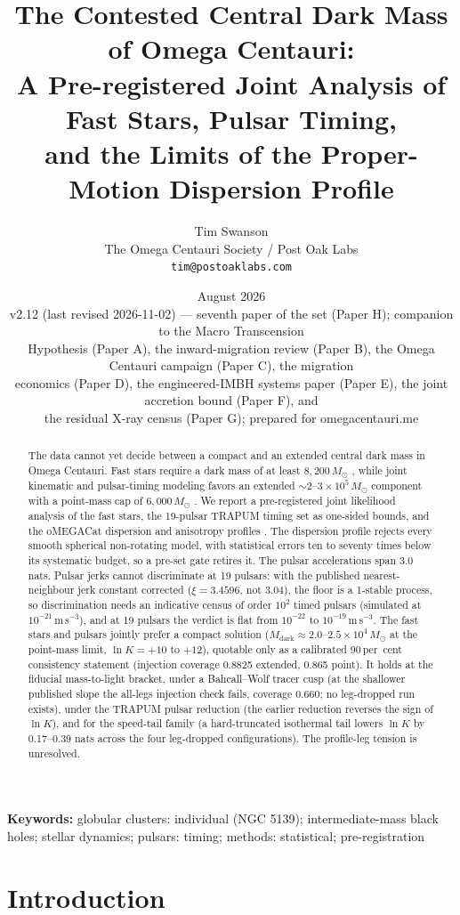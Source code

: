 \documentclass[11pt]{article}
\title{\textbf{The Contested Central Dark Mass of Omega Centauri:\\ A Pre-registered Joint Analysis of Fast Stars, Pulsar Timing,\\ and the Limits of the Proper-Motion Dispersion Profile}}
\author{Tim Swanson\\[2pt]
\small The Omega Centauri Society / Post Oak Labs\\
\small \texttt{tim@postoaklabs.com}}
\date{August 2026 \\[4pt] \small v2.12 (last revised 2026-11-02) --- seventh paper of the set (Paper H); companion to the Macro Transcension\\ \small Hypothesis (Paper A), the inward-migration review (Paper B), the Omega Centauri campaign (Paper C), the migration\\ \small economics (Paper D), the engineered-IMBH systems paper (Paper E), the joint accretion bound (Paper F), and\\ \small the residual X-ray census (Paper G); prepared for omegacentauri.me}
\newcommand{\msun}{\ensuremath{M_\odot}}
\newcommand{\mdark}{\ensuremath{M_{\mathrm{dark}}}}
\newcommand{\lnK}{\ensuremath{\ln K}}
\begin{document}
\maketitle

\begin{abstract}
\noindent
The data cannot yet decide between a compact and an extended central dark mass in Omega Centauri. Fast stars require a dark mass of at least $8{,}200\,\msun$ \citep{Haberle2024Nature}, while joint kinematic and pulsar-timing modeling favors an extended $\sim 2$--$3\times10^{5}\,\msun$ component with a point-mass cap of $6{,}000\,\msun$ \citep{BanaresHernandez2025}. We report a pre-registered joint likelihood analysis of the fast stars, the 19-pulsar TRAPUM timing set \citep{ColomiBernadich2026} as one-sided bounds, and the oMEGACat dispersion and anisotropy profiles \citep{oMEGACatVI2025}. The dispersion profile rejects every smooth spherical non-rotating model, with statistical errors ten to seventy times below its systematic budget, so a pre-set gate retires it. The pulsar accelerations span 3.0 nats. Pulsar jerks cannot discriminate at 19 pulsars: with the published nearest-neighbour jerk constant corrected ($\xi = 3.4596$, not 3.04), the floor is a 1-stable process, so discrimination needs an indicative census of order $10^{2}$ timed pulsars (simulated at $10^{-21}$\,m\,s$^{-3}$), and at 19 pulsars the verdict is flat from $10^{-22}$ to $10^{-19}$\,m\,s$^{-3}$. The fast stars and pulsars jointly prefer a compact solution ($\mdark \approx 2.0$--$2.5\times10^{4}\,\msun$ at the point-mass limit, $\lnK = +10$ to $+12$), quotable only as a calibrated 90\,per~cent consistency statement (injection coverage 0.8825 extended, 0.865 point). It holds at the fiducial mass-to-light bracket, under a Bahcall--Wolf tracer cusp (at the shallower published slope the all-legs injection check fails, coverage 0.660; no leg-dropped run exists), under the TRAPUM pulsar reduction (the earlier reduction reverses the sign of $\lnK$), and for the speed-tail family (a hard-truncated isothermal tail lowers $\lnK$ by 0.17--0.39 nats across the four leg-dropped configurations). The profile-leg tension is unresolved.
\end{abstract}

\bigskip
\noindent\textbf{Keywords:} globular clusters: individual (NGC 5139); intermediate-mass black holes; stellar dynamics; pulsars: timing; methods: statistical; pre-registration

\newpage
\tableofcontents
\newpage

\section{Introduction}
\label{sec:intro}
\end{document}
